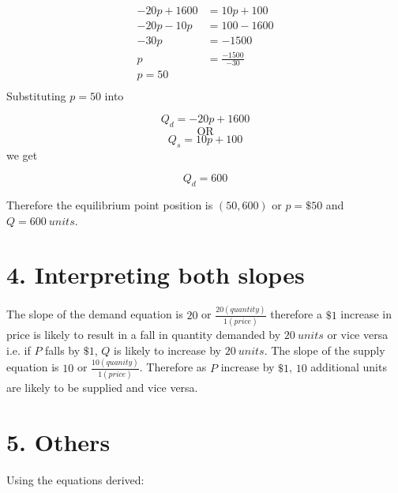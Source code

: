 \documentclass[table]{article}
\begin{document}
    $$
        \begin{aligned}
            -20p + 1600 & = 10p + 100         \\
            -20p - 10p  & = 100 - 1600        \\
            -30p        & = -1500             \\
            p           & = \frac{-1500}{-30} \\
            p = 50                            \\
        \end{aligned}
    $$
    Substituting $p=50$ into

    $$Q_d = -20p+1600$$
    $$\text{OR}$$
    $$Q_s = 10p+100$$
    we get

    $$Q_d = 600$$

    Therefore the equilibrium point position is $(50, 600)$ or $p = \$50$ and $Q = 600 \ units$.

    \section*{4. Interpreting both slopes}

    The slope of the demand equation is $20$ or $\frac{20(quantity)}{1(price)}$ therefore a $\$1$ increase in price is likely to result in a fall in quantity demanded by $20 \ units$ or vice versa i.e. if $P$ falls by $\$1$, $Q$ is likely to increase by $20 \ units$.
    The slope of the supply equation is $10$ or  $\frac{10(quanity)}{1(price)}$. Therefore as $P$ increase by $\$1$, $10$ additional units are likely to be supplied and vice versa.

\section*{5. Others}

Using the equations derived:
\end{document}
